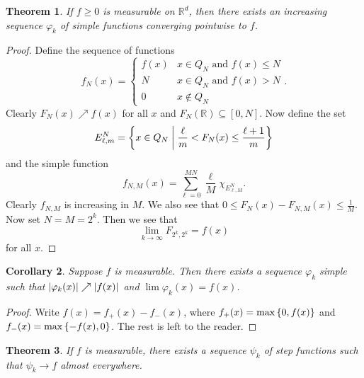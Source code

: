 \documentclass[leqno, openany]{memoir}
\newtheorem{thm}{Theorem}[chapter]
\newtheorem{cor}[thm]{Corollary}
\theoremstyle{definition}
\theoremstyle{remark}
\theoremstyle{plain}
\theoremstyle{definition}
\theoremstyle{remark}
\newcommand{\R}{\mathbb{R}}
\begin{document}
\begin{thm} If $f \geq 0$ is measurable on $\R^d$, then there exists an
increasing sequence $\varphi_k$ of simple functions converging pointwise to
$f$.  \end{thm}

\begin{proof} Define the sequence of functions \[ f_N(x) = \begin{cases} f(x) &
x \in Q_N \text{ and } f(x) \leq N \\ N & x \in Q_N \text{ and } f(x) > N \\ 0
                                        & x \notin Q_N \end{cases}. \] Clearly
                                        $F_N(x) \nearrow f(x)$ for all $x$ and
                                        $F_N(\R) \subseteq [0,N]$. Now define
                                        the set \[ E_{\ell,m}^N = \qty{ x \in
                                            Q_N \mathrel{\bigg|} \frac{\ell}{m}
                                        < F_N(x) \leq \frac{\ell+1}{m} } \] and
                                        the simple function \[ f_{N,M}(x) =
                                        \sum_{\ell = 0}^{MN} \frac{\ell}{M}
                                    \chi_{E_{\ell,M}^N}. \] Clearly $f_{N,M}$
                                    is increasing in $M$. We also see that $0
                                    \leq F_N(x) - F_{N,M}(x) \leq \frac{1}{M}$.
                                    Now set $N = M = 2^k$. Then we see that \[
                                    \lim_{k \to \infty} F_{2^k,2^k} = f(x) \]
                                for all $x$.  \end{proof}

\begin{cor} Suppose $f$ is measurable. Then there exists a sequence $\varphi_k$
simple such that $\abs{\varphi_k(x)} \nearrow \abs{f(x)}$ and $\lim
\varphi_k(x) = f(x)$.  \end{cor}

\begin{proof} Write $f(x) = f_+(x) - f_-(x)$, where $f_+(x) = \max
\qty{0,f(x)}$ and $f_-(x) = \max \qty{-f(x),0}$. The rest is left to the
reader.  \end{proof}

\begin{thm} If $f$ is measurable, there exists a sequence $\psi_k$ of step
functions such that $\psi_k \to f$ almost everywhere.  \end{thm}
\end{document}
